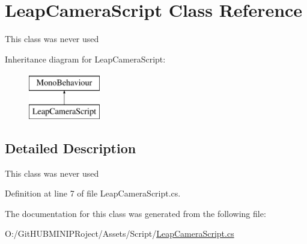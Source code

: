 \hypertarget{class_leap_camera_script}{}\section{Leap\+Camera\+Script Class Reference}
\label{class_leap_camera_script}


This class was never used  


Inheritance diagram for Leap\+Camera\+Script\+:\begin{figure}[H]
\begin{center}
\leavevmode
\includegraphics[height=2.000000cm]{class_leap_camera_script}
\end{center}
\end{figure}


\subsection{Detailed Description}
This class was never used 



Definition at line 7 of file Leap\+Camera\+Script.\+cs.



The documentation for this class was generated from the following file\+:\begin{DoxyCompactItemize}
\item 
O\+:/\+Git\+H\+U\+B\+M\+I\+N\+I\+P\+Roject/\+Assets/\+Script/\mbox{\hyperlink{_leap_camera_script_8cs}{Leap\+Camera\+Script.\+cs}}\end{DoxyCompactItemize}
